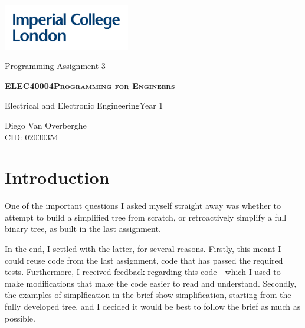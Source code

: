 \documentclass[12pt]{article}
\newcommand{\documenttype}{Programming Assignment 3}
\newcommand{\modulecode}{ELEC40004}
\newcommand{\modulename}{Programming for Engineers}
\newcommand{\cid}{02030354}
\newcommand{\degreeyear}{1}
\newcommand{\degree}{Electrical and Electronic Engineering}
\newcommand{\authorfullname}{Diego Van Overberghe}
\begin{document}
\thispagestyle{empty}
\includegraphics[height=2cm]{rsc/IMP_ML_1CS_4CP_CLEAR-SPACE.png}
    \vspace{4cm}
    \begin{center}
        \LARGE \documenttype
    \end{center}
    \vspace{1cm}
    \begin{center}
        \textsc{\LARGE \bfseries \modulecode \quad \modulename}
    \end{center}
    \begin{center}
        {\Large \degree \quad Year \degreeyear}
    \end{center}
    \vspace{1cm}
    \begin{center}
        {\Large \authorfullname \\[1ex] CID: \cid}
    \end{center}

    \newpage

    \section{Introduction}

    One of the important questions I asked myself straight away was whether to attempt to build a simplified tree from scratch, or retroactively simplify a full binary tree, as built in the last assignment.

    In the end, I settled with the latter, for several reasons. Firstly, this meant I could reuse code from the last assignment, code that has passed the required tests. Furthermore, I received feedback regarding this code---which I used to make modifications that make the code easier to read and understand. Secondly, the examples of simplfication in the brief show simplification, starting from the fully developed tree, and I decided it would be best to follow the brief as much as possible.
\end{document}
